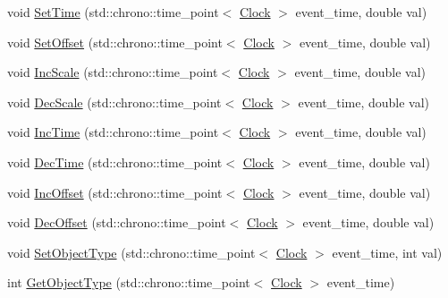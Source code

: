 \begin{DoxyCompactItemize}
\item 
void \hyperlink{class_dimension_a0558d45fe020ba1d1895e521a411decb}{Set\+Time} (std\+::chrono\+::time\+\_\+point$<$ \hyperlink{universe_8h_a0ef8d951d1ca5ab3cfaf7ab4c7a6fd80}{Clock} $>$ event\+\_\+time, double val)
\item 
void \hyperlink{class_dimension_af74dd7af3af95c0a51b001b6ad665300}{Set\+Offset} (std\+::chrono\+::time\+\_\+point$<$ \hyperlink{universe_8h_a0ef8d951d1ca5ab3cfaf7ab4c7a6fd80}{Clock} $>$ event\+\_\+time, double val)
\item 
void \hyperlink{class_dimension_aa323eaa2c592e498d48e0739009ec313}{Inc\+Scale} (std\+::chrono\+::time\+\_\+point$<$ \hyperlink{universe_8h_a0ef8d951d1ca5ab3cfaf7ab4c7a6fd80}{Clock} $>$ event\+\_\+time, double val)
\item 
void \hyperlink{class_dimension_a4bd8e584c3bb68ebd7ca0463f8905813}{Dec\+Scale} (std\+::chrono\+::time\+\_\+point$<$ \hyperlink{universe_8h_a0ef8d951d1ca5ab3cfaf7ab4c7a6fd80}{Clock} $>$ event\+\_\+time, double val)
\item 
void \hyperlink{class_dimension_afc61c6d6d68ec0ed461458d504fec16f}{Inc\+Time} (std\+::chrono\+::time\+\_\+point$<$ \hyperlink{universe_8h_a0ef8d951d1ca5ab3cfaf7ab4c7a6fd80}{Clock} $>$ event\+\_\+time, double val)
\item 
void \hyperlink{class_dimension_a25978bcb1f62aa7ed909463d08d92ca4}{Dec\+Time} (std\+::chrono\+::time\+\_\+point$<$ \hyperlink{universe_8h_a0ef8d951d1ca5ab3cfaf7ab4c7a6fd80}{Clock} $>$ event\+\_\+time, double val)
\item 
void \hyperlink{class_dimension_aaf18cc220562b30f9e7aee92f16cc08e}{Inc\+Offset} (std\+::chrono\+::time\+\_\+point$<$ \hyperlink{universe_8h_a0ef8d951d1ca5ab3cfaf7ab4c7a6fd80}{Clock} $>$ event\+\_\+time, double val)
\item 
void \hyperlink{class_dimension_a2017e62d4b3caf31f4f1b6b5cf59a798}{Dec\+Offset} (std\+::chrono\+::time\+\_\+point$<$ \hyperlink{universe_8h_a0ef8d951d1ca5ab3cfaf7ab4c7a6fd80}{Clock} $>$ event\+\_\+time, double val)
\item 
void \hyperlink{class_dimension_a484621a7c6f9b43f6e251ba04e0fdf8b}{Set\+Object\+Type} (std\+::chrono\+::time\+\_\+point$<$ \hyperlink{universe_8h_a0ef8d951d1ca5ab3cfaf7ab4c7a6fd80}{Clock} $>$ event\+\_\+time, int val)
\item 
int \hyperlink{class_dimension_a72f494215a114cb43cecd9b170bcde51}{Get\+Object\+Type} (std\+::chrono\+::time\+\_\+point$<$ \hyperlink{universe_8h_a0ef8d951d1ca5ab3cfaf7ab4c7a6fd80}{Clock} $>$ event\+\_\+time)

\end{DoxyCompactItemize}
